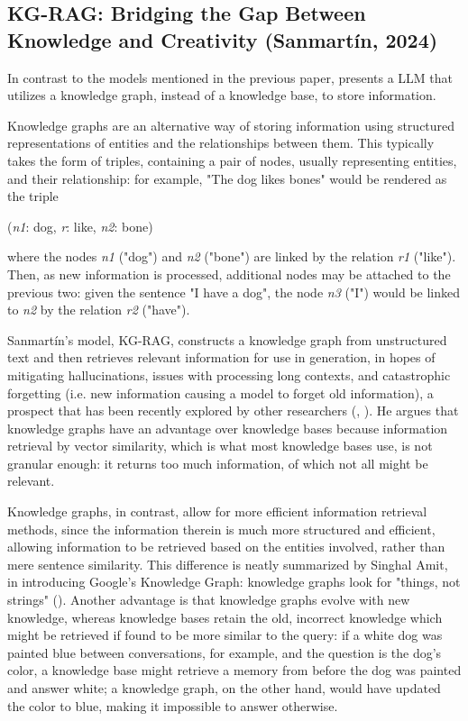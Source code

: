 \subsection{KG-RAG: Bridging the Gap Between Knowledge and Creativity (Sanmartín, 2024)}

In contrast to the models mentioned in the previous paper, \cite{Sanmartin2024} presents a LLM that utilizes a knowledge graph, instead of a knowledge base, to store information.

Knowledge graphs are an alternative way of storing information using structured representations of entities and the relationships between them. This typically takes the form of triples, containing a pair of nodes, usually representing entities, and their relationship: for example, "The dog likes bones" would be rendered as the triple
	
\begin{displayquote}
(\textit{n1}: dog, \textit{r}: like, \textit{n2}: bone)
\end{displayquote}
	
\noindent where the nodes \textit{n1} ("dog") and \textit{n2} ("bone") are linked by the relation \textit{r1} ("like"). Then, as new information is processed, additional nodes may be attached to the previous two: given the sentence "I have a dog", the node \textit{n3} ("I") would be linked to \textit{n2} by the relation \textit{r2} ("have").

Sanmartín's model, KG-RAG, constructs a knowledge graph from unstructured text and then retrieves relevant information for use in generation, in hopes of mitigating hallucinations, issues with processing long contexts, and catastrophic forgetting (i.e. new information causing a model to forget old information), a prospect that has been recently explored by other researchers (\cite{Guan2023}, \cite{Yang2024}). He argues that knowledge graphs have an advantage over knowledge bases because information retrieval by vector similarity, which is what most knowledge bases use, is not granular enough: it returns too much information, of which not all might be relevant.
	
Knowledge graphs, in contrast, allow for more efficient information retrieval methods, since the information therein is much more structured and efficient, allowing information to be retrieved based on the entities involved, rather than mere sentence similarity. This difference is neatly summarized by Singhal Amit, in introducing Google's Knowledge Graph: knowledge graphs look for "things, not strings" (\cite{Singhal2012}). Another advantage is that knowledge graphs evolve with new knowledge, whereas knowledge bases retain the old, incorrect knowledge which might be retrieved if found to be more similar to the query: if a white dog was painted blue between conversations, for example, and the question is the dog's color, a knowledge base might retrieve a memory from before the dog was painted and answer white; a knowledge graph, on the other hand, would have updated the color to blue, making it impossible to answer otherwise.
	
